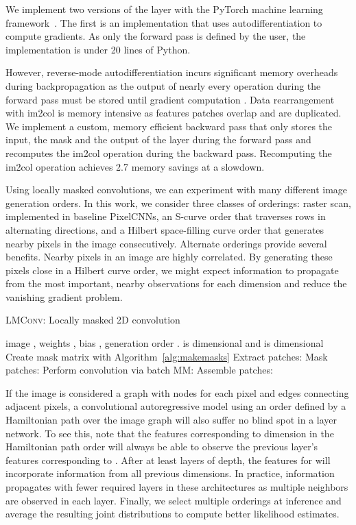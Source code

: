 \documentclass[letterpaper]{article}
\begin{document}
We implement two versions of the layer with the PyTorch machine learning framework~\citep{NEURIPS2019_9015}. The first is an implementation that uses autodifferentiation to compute gradients. As only the forward pass is defined by the user, the implementation is under 20 lines of Python.

However, reverse-mode autodifferentiation incurs significant memory overheads during backpropagation as the output of nearly every operation during the forward pass must be stored until gradient computation \citep{griewank2000algorithm, mlsys2020_196}. Data rearrangement with im2col is memory intensive as features patches overlap and are duplicated. We implement a custom, memory efficient backward pass that only stores the input, the mask and the output of the layer during the forward pass and recomputes the im2col operation during the backward pass. Recomputing the im2col operation achieves 2.7 memory savings at a  slowdown.

Using locally masked convolutions, we can experiment with many different image generation orders. In this work, we consider three classes of orderings: raster scan, implemented in baseline PixelCNNs, an S-curve order that traverses rows in alternating directions, and a Hilbert space-filling curve order that generates nearby pixels in the image consecutively. Alternate orderings provide several benefits. Nearby pixels in an image are highly correlated. By generating these pixels close in a Hilbert curve order, we might expect information to propagate from the most important, nearby observations for each dimension and reduce the vanishing gradient problem.

\begin{algorithm}[t]
   \caption{\textsc{LMConv}: Locally masked 2D convolution}
   \label{alg:lmconv}
\begin{algorithmic}[1]
    image , weights , bias , generation order .  is  dimensional and  is  dimensional
   \STATE Create mask matrix  with Algorithm~\ref{alg:makemasks}
   \STATE Extract patches: 
   \STATE Mask patches: 
   \STATE Perform convolution via batch MM: 
   \STATE Assemble patches: 
\end{algorithmic}
\end{algorithm}

If the image is considered a graph with nodes for each pixel and edges connecting adjacent pixels, a convolutional autoregressive model using an order defined by a Hamiltonian path over the image graph will also suffer no blind spot in a  layer network. To see this, note that the features corresponding to dimension  in the Hamiltonian path order will always be able to observe the previous layer's features corresponding to . After at least  layers of depth, the features for  will incorporate information from all  previous dimensions. In practice, information propagates with fewer required layers in these architectures as multiple neighbors are observed in each layer. Finally, we select multiple orderings at inference and average the resulting joint distributions to compute better likelihood estimates.
\end{document}
